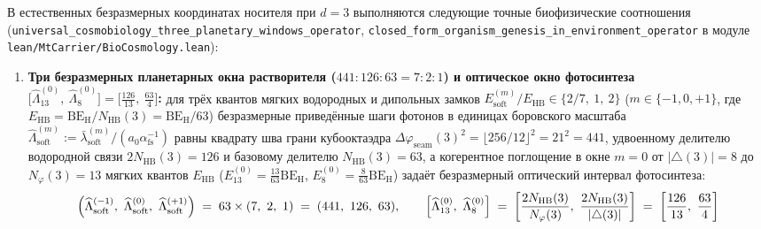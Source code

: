 \begin{theorem}
\label{thm:mono-bio-windows-folding}
В естественных безразмерных координатах носителя при $d = 3$ выполняются следующие точные биофизические соотношения (\texttt{universal\_\allowbreak cosmobiology\_\allowbreak three\_\allowbreak planetary\_\allowbreak windows\_\allowbreak operator}, \texttt{closed\_\allowbreak form\_\allowbreak organism\_\allowbreak genesis\_\allowbreak in\_\allowbreak environment\_\allowbreak operator} в модуле \texttt{lean/\allowbreak MtCarrier/\allowbreak BioCosmology.lean}):
\begin{enumerate}[label=\textbf{\arabic*.},noitemsep]
\item \textbf{Три безразмерных планетарных окна растворителя ($441 : 126 : 63 = 7 : 2 : 1$) и оптическое окно фотосинтеза $\bigl[\widehat{\Lambda}_{13}^{(0)},\ \widehat{\Lambda}_{8}^{(0)}\bigr] = \bigl[\frac{126}{13},\ \frac{63}{4}\bigr]$:}
  для трёх квантов мягких водородных и дипольных замков $E_{\mathrm{soft}}^{(m)} / E_{\mathrm{HB}} \in \{2/7,\ 1,\ 2\}$ ($m \in \{-1, 0, +1\}$, где $E_{\mathrm{HB}} = \mathrm{BE}_{\mathrm{H}} / N_{\mathrm{HB}}(3) = \mathrm{BE}_{\mathrm{H}} / 63$) безразмерные приведённые шаги фотонов в единицах боровского масштаба $\widehat{\Lambda}_{\mathrm{soft}}^{(m)} := \bar{\lambda}_{\mathrm{soft}}^{(m)} / (a_0\alpha_{\mathrm{fs}}^{-1})$ равны квадрату шва грани кубооктаэдра $\Delta\varphi_{\mathrm{seam}}(3)^2 = \lfloor 256/12 \rfloor^2 = 21^2 = 441$, удвоенному делителю водородной связи $2 N_{\mathrm{HB}}(3) = 126$ и базовому делителю $N_{\mathrm{HB}}(3) = 63$, а когерентное поглощение в окне $m = 0$ от $|{\triangle}(3)| = 8$ до $N_\varphi(3) = 13$ мягких квантов $E_{\mathrm{HB}}$ ($E_{13}^{(0)} = \frac{13}{63}\mathrm{BE}_{\mathrm{H}}$, $E_{8}^{(0)} = \frac{8}{63}\mathrm{BE}_{\mathrm{H}}$) задаёт безразмерный оптический интервал фотосинтеза:
  \begin{equation}
    \label{eq:mono-three-bio-windows}
    \Bigl(\widehat{\Lambda}_{\mathrm{soft}}^{(-1)},\ \widehat{\Lambda}_{\mathrm{soft}}^{(0)},\ \widehat{\Lambda}_{\mathrm{soft}}^{(+1)}\Bigr)
    \;=\; 63 \times (7,\ 2,\ 1) \;=\; (441,\ 126,\ 63),
    \qquad
    \Bigl[\widehat{\Lambda}_{13}^{(0)},\ \widehat{\Lambda}_{8}^{(0)}\Bigr]
    \;=\; \left[\frac{2 N_{\mathrm{HB}}(3)}{N_\varphi(3)},\ \frac{2 N_{\mathrm{HB}}(3)}{|{\triangle}(3)|}\right]
    \;=\; \left[\frac{126}{13},\ \frac{63}{4}\right]
  \end{equation}

\end{enumerate}
\end{theorem}
